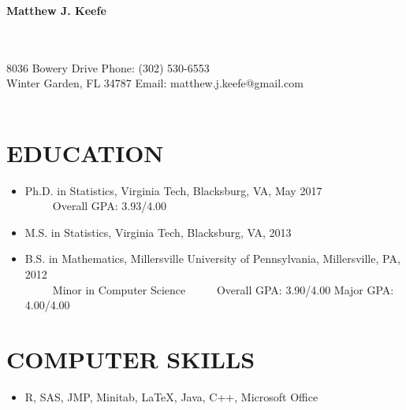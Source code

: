 \documentclass[10pt]{article}
\begin{document}
\begin{center}
{\Large{\bf{Matthew J. Keefe}}}\\
\end{center}
\underline{\hspace{7.3in}}\\
~~\\
8036 Bowery Drive  \hfill Phone: (302) 530-6553\\
Winter Garden, FL 34787 \hfill Email: matthew.j.keefe@gmail.com\\
\underline{\hspace{7.3in}}\\
\section*{EDUCATION}
\begin{itemize}
\item[] {Ph.D.} in Statistics,  Virginia Tech, Blacksburg, VA, May 2017  \\
\mbox{~~~~~}Overall GPA: 3.93/4.00 
\item[] {M.S.} in Statistics, Virginia Tech, Blacksburg, VA, 2013
\item[] { B.S.} in Mathematics, Millersville University of Pennsylvania, Millersville, PA, 2012\\
\mbox{~~~~~}Minor in Computer Science
\mbox{~~~~~}Overall GPA: 3.90/4.00 \hspace{12pt} Major GPA: 4.00/4.00 
\end{itemize}

\section*{COMPUTER SKILLS}
\begin{itemize}
\item[] R, SAS, JMP, Minitab, \LaTeX, Java, C++, Microsoft Office 
\end{itemize}
\end{document}
